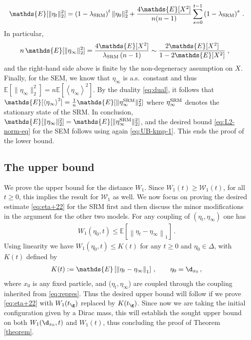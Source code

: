 \documentclass[11pt,reqno]{amsart}
\theoremstyle{remark}
\theoremstyle{definition}
\numberwithin{equation}{section}
\numberwithin{figure}{section}
\newcommand{\E}{\mathds{E}}
\newcommand{\comma}{\; \text{,}\;\;}
\newcommand{\tonde}[1]{\left(#1\right)}
\newcommand{\cW}{\ensuremath{\mathcal W}}
\let\D=\Delta \let\F=\Phi  \let\G=\Gamma  \let\L=\Lambda \let\The=\Theta
\begin{document}
\begin{equation}
		\E[\|\eta_t\|_2^2] = \tonde{1-\lambda_{\rm SRM}}^t \|\eta_0\|_2^2 + \frac{4\E[X^2]}{n(n-1)}\sum_{s=0}^{t-1}\tonde{1-\lambda_{\rm SRM}}^s  \,.
	\end{equation} In particular, 
	\begin{equation}\label{eq:UB-kmp-1}
		n\,\E[\|\eta_\infty\|_2^2] = \frac{4\E[X^2]}{\lambda_{\rm SRM}\tonde{n-1}} 
		\sim \frac{2\E[X^2]}{1-2\E[X^2]}\comma
	\end{equation}
	and the right-hand side above is finite by the non-degeneracy assumption on $X$.
Finally, for the SEM, we know that $\eta_\infty$ is a.s.\ constant and thus $\E[\|\eta_\infty\|_2^2]= n \E[\left \langle \eta_\infty\right\rangle^2]$. By the duality \eqref{eq:dual}, it follows that $\E[\left \langle \eta_\infty\right\rangle^2] = \frac1n \E[\|\eta^{\rm SRM}_\infty\|_2^2]$ where $\eta^{\rm SRM}_\infty$ denotes the stationary state of the SRM. In conclusion, $\E[\|\eta_\infty\|_2^2]= \E[\|\eta^{\rm SRM}_\infty\|_2^2]$, and the desired bound \eqref{eq:L2-norm-eq} for the SEM follows using again  \eqref{eq:UB-kmp-1}. 
This ends the proof of the lower bound. 
	\subsection{The upper bound}
	We prove the upper bound for the distance $W_1$. Since $W_1(t)\ge \cW_1(t)$, for all $t\ge 0$, this implies the result for $\cW_1$ as well. 	We now focus on proving the desired estimate \eqref{eq:eta+22} for the SRM first and then discuss the minor modifications in the argument for the other two models. For any coupling of $ (\eta_{t},\eta_{\infty})$ one has 
	\begin{align}\label{eq:three0}
			W_1(\eta_0,t)\le  \E\left[\left\|\eta_{t}-\eta_{\infty} \right\|_1 \right] \,.
	\end{align}
Using linearity we have $W_1(\eta_0,t)\le K(t)$ for any $t\ge 0$ and $\eta_0\in\D$, with $K(t)$ defined by  
	\begin{align}\label{eq:three01}
			K(t):=  \E\left[\left\|\eta_{t}-\eta_{\infty} \right\|_1 \right] \,, \qquad \eta_0=\d_{x_0}\,,
	\end{align}
	where $x_0$ is any fixed particle, and ($ \eta_{t},\eta_{\infty}$) are coupled through the coupling inherited from \eqref{eq:repres}. Thus the desired upper bound  will follow if we prove \eqref{eq:eta+22} with $W_1(t_\g)$ replaced by $K(t_\g)$.
Since now we are taking the initial configuration given by a Dirac mass, this will establish the sought upper bound on both $W_1(\d_{x_0},t)$ and  $W_1(t)$, thus concluding the proof of Theorem \ref{theorem}.
	
\end{document}
